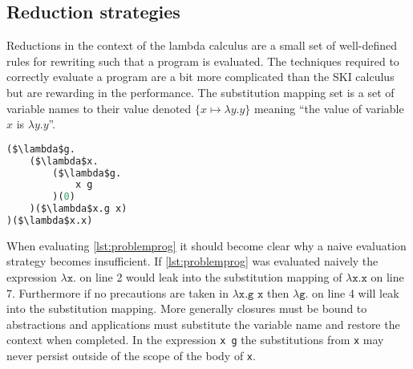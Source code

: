 \documentclass[11pt,oneside,a4paper]{report}
\begin{document}
\subsection{Reduction strategies}
Reductions in the context of the lambda calculus are a small set of well-defined rules for rewriting such that a program is evaluated.
The techniques required to correctly evaluate a program are a bit more complicated than the SKI calculus but are rewarding in the performance.
The substitution mapping set is a set of variable names to their value denoted $\{ x \mapsto \lambda y . y \}$ meaning ``the value of variable $x$ is $\lambda y . y$''.
\begin{lstlisting}[language=ML,caption={Problematic program},label={lst:problemprog},mathescape=true]
($\lambda$g.
    ($\lambda$x.
        ($\lambda$g.
            x g
        )(0)
    )($\lambda$x.g x)
)($\lambda$x.x)
\end{lstlisting}
When evaluating \autoref{lst:problemprog} it should become clear why a naive evaluation strategy becomes insufficient.
If \autoref{lst:problemprog} was evaluated naively the expression $\lambda\texttt{x.}$ on line 2 would leak into the substitution mapping of $\lambda\texttt{x.x}$ on line 7.
Furthermore if no precautions are taken in $\lambda\texttt{x.g x}$ then $\lambda\texttt{g.}$ on line 4 will leak into the substitution mapping. 
More generally closures must be bound to abstractions and applications must substitute the variable name and restore the context when completed.
In the expression \texttt{x g} the substitutions from \texttt{x} may never persist outside of the scope of the body of \texttt{x}.
\end{document}
